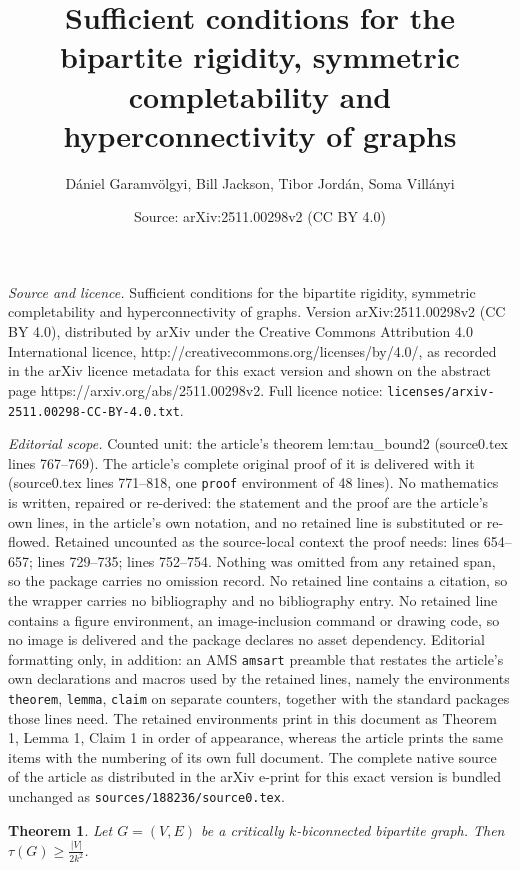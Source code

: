 \documentclass[10pt,a4paper]{amsart}
\title{Sufficient conditions for the bipartite rigidity, symmetric completability and hyperconnectivity of graphs}
\author{D\'aniel Garamv\"olgyi, Bill Jackson, Tibor Jord\'an, Soma Vill\'anyi}
\date{Source: arXiv:2511.00298v2 (CC BY 4.0)}
\newtheorem{theorem}{Theorem}
\begin{document}
\maketitle

\noindent\emph{Source and licence.} Sufficient conditions for the bipartite rigidity, symmetric completability and hyperconnectivity of graphs. Version arXiv:2511.00298v2 (CC BY 4.0), distributed by arXiv under the Creative Commons Attribution 4.0 International licence, http://creativecommons.org/licenses/by/4.0/, as recorded in the arXiv licence metadata for this exact version and shown on the abstract page https://arxiv.org/abs/2511.00298v2. Full licence notice: \texttt{licenses/arxiv-2511.00298-CC-BY-4.0.txt}.\par\smallskip

\noindent\textit{Editorial scope.} Counted unit: the article's theorem lem:tau\_bound2 (source0.tex lines 767--769). The article's complete original proof of it is delivered with it (source0.tex lines 771--818, one \texttt{proof} environment of 48 lines). No mathematics is written, repaired or re-derived: the statement and the proof are the article's own lines, in the article's own notation, and no retained line is substituted or re-flowed.  Retained uncounted as the source-local context the proof needs: lines 654--657; lines 729--735; lines 752--754.  Nothing was omitted from any retained span, so the package carries no omission record.  No retained line contains a citation, so the wrapper carries no bibliography and no bibliography entry.  No retained line contains a figure environment, an image-inclusion command or drawing code, so no image is delivered and the package declares no asset dependency.  Editorial formatting only, in addition: an AMS \texttt{amsart} preamble that restates the article's own declarations and macros used by the retained lines, namely the environments \texttt{theorem}, \texttt{lemma}, \texttt{claim} on separate counters, together with the standard packages those lines need.  The retained environments print in this document as Theorem 1, Lemma 1, Claim 1 in order of appearance, whereas the article prints the same items with the numbering of its own full document.  The complete native source of the article as distributed in the arXiv e-print for this exact version is bundled unchanged as \texttt{sources/188236/source0.tex}.
\begin{theorem}\label{lem:tau_bound}
    Let $G=(V,E)$ be a critically $k$-biconnected bipartite graph.
    Then $\tau(G)\geq \frac{|V|}{2k^2}$.
\end{theorem}
\end{document}
